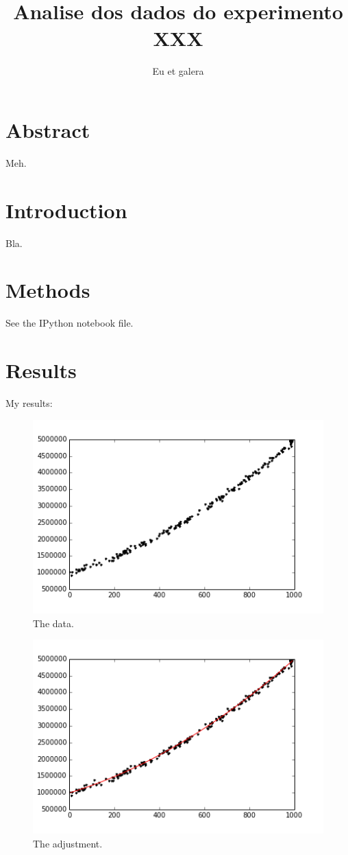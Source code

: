 \documentclass[twocolumn]{article}
\title{Analise dos dados do experimento XXX}
\author{Eu et galera}
\begin{document}
\maketitle


\section{Abstract}

Meh.

\section{Introduction}

Bla.

\section{Methods}

See the IPython notebook file.

\section{Results}

My results:


\begin{figure}[!hb]
    \includegraphics[scale=0.5]{notebook/dados.png}
    \caption{The data.}
\end{figure}

\begin{figure}[!hb]
    \includegraphics[scale=0.5]{notebook/ajuste.png}
    \caption{The adjustment.}
\end{figure}
\end{document}
